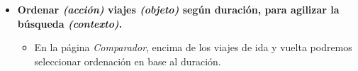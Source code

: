 \begin{itemize}
    \item \textbf{Ordenar \textit{(acción)} viajes \textit{(objeto)} según duración, para agilizar la búsqueda \textit{(contexto)}.}
        \begin{itemize}
            \item En la página \textit{Comparador}, encima de los viajes de ida y vuelta podremos seleccionar ordenación en base al duración.
        \end{itemize}
\end{itemize}